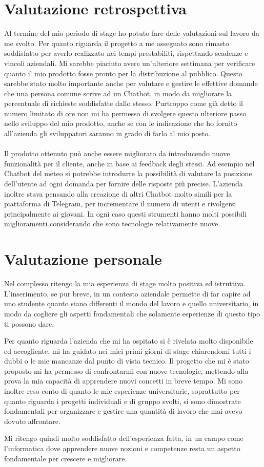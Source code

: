 \section{Valutazione retrospettiva}
Al termine del mio periodo di stage ho potuto fare delle valutazioni sul lavoro da me svolto. Per quanto riguarda il progetto a me assegnato sono rimasto soddisfatto per averlo realizzato nei tempi prestabiliti, rispettando scadenze e vincoli aziendali. Mi sarebbe piaciuto avere un'ulteriore settimana per verificare quanto il mio prodotto fosse pronto per la distribuzione al pubblico. Questo sarebbe stato molto importante anche per valutare e gestire le effettive domande che una persona comune scrive ad un \gls{Chatbot}, in modo da migliorare la percentuale di richieste soddisfatte dallo stesso. Purtroppo come già detto il numero limitato di ore non mi ha permesso di svolgere questo ulteriore passo nello sviluppo del mio prodotto, anche se con le indicazione che ho fornito all'azienda gli sviluppatori saranno in grado di farlo al mio posto.\\ \\
Il prodotto ottenuto può anche essere migliorato da \azienda{} introducendo nuove funzionalità per il cliente, anche in base ai feedback degli stessi. Ad esempio nel \gls{Chatbot} del meteo si potrebbe introdurre la possibilità di valutare la posizione dell'utente ad ogni domanda per fornire delle risposte più precise. L'azienda inoltre stava pensando alla creazione di altri \gls{Chatbot} molto simili per la piattaforma di Telegram, per incrementare il numero di utenti e rivolgersi principalmente ai giovani. In ogni caso questi strumenti hanno molti possibili miglioramenti considerando che sono tecnologie relativamente nuove.

\section{Valutazione personale}
Nel complesso ritengo la mia esperienza di stage molto positiva ed istruttiva. L'inserimento, se pur breve, in un contesto aziendale permette di far capire ad uno studente quanto siano differenti il mondo del lavoro e quello universitario, in modo da cogliere gli aspetti fondamentali che solamente esperienze di questo tipo ti possono dare.

Per quanto riguarda l'azienda che mi ha ospitato si è rivelata molto disponibile ed accogliente, mi ha guidato nei miei primi giorni di stage chiarendomi tutti i dubbi o le mie mancanze dal punto di vista tecnico. Il progetto che mi è stato proposto mi ha permesso di confrontarmi con nuove tecnologie, mettendo alla prova la mia capacità di apprendere nuovi concetti in breve tempo. Mi sono inoltre reso conto di quanto le mie esperienze universitarie, soprattutto per quanto riguarda i progetti individuali e di gruppo svolti, si sono dimostrate fondamentali per organizzare e gestire una quantità di lavoro che mai avevo dovuto affrontare.

Mi ritengo quindi molto soddisfatto dell'esperienza fatta, in un campo come l'informatica dove apprendere nuove nozioni e competenze resta un aspetto fondamentale per crescere e migliorare. 